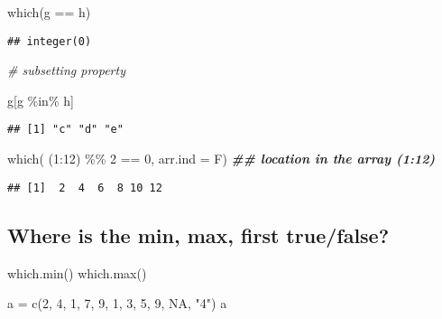 \documentclass[
]{book}
\newenvironment{Shaded}{\begin{snugshade}}{\end{snugshade}}
\newcommand{\AttributeTok}[1]{\textcolor[rgb]{0.77,0.63,0.00}{#1}}
\newcommand{\CommentTok}[1]{\textcolor[rgb]{0.56,0.35,0.01}{\textit{#1}}}
\newcommand{\ConstantTok}[1]{\textcolor[rgb]{0.00,0.00,0.00}{#1}}
\newcommand{\DecValTok}[1]{\textcolor[rgb]{0.00,0.00,0.81}{#1}}
\newcommand{\DocumentationTok}[1]{\textcolor[rgb]{0.56,0.35,0.01}{\textbf{\textit{#1}}}}
\newcommand{\FunctionTok}[1]{\textcolor[rgb]{0.00,0.00,0.00}{#1}}
\newcommand{\NormalTok}[1]{#1}
\newcommand{\OtherTok}[1]{\textcolor[rgb]{0.56,0.35,0.01}{#1}}
\newcommand{\SpecialCharTok}[1]{\textcolor[rgb]{0.00,0.00,0.00}{#1}}
\newcommand{\StringTok}[1]{\textcolor[rgb]{0.31,0.60,0.02}{#1}}
\begin{document}
\begin{Shaded}
\begin{Highlighting}[]
\FunctionTok{which}\NormalTok{(g }\SpecialCharTok{==}\NormalTok{ h)}
\end{Highlighting}
\end{Shaded}

\begin{verbatim}
## integer(0)
\end{verbatim}

\begin{Shaded}
\begin{Highlighting}[]
\CommentTok{\# subsetting property}

\NormalTok{g[g }\SpecialCharTok{\%in\%}\NormalTok{ h]}
\end{Highlighting}
\end{Shaded}

\begin{verbatim}
## [1] "c" "d" "e"
\end{verbatim}

\begin{Shaded}
\begin{Highlighting}[]
\FunctionTok{which}\NormalTok{( (}\DecValTok{1}\SpecialCharTok{:}\DecValTok{12}\NormalTok{) }\SpecialCharTok{\%\%} \DecValTok{2} \SpecialCharTok{==} \DecValTok{0}\NormalTok{, }\AttributeTok{arr.ind =}\NormalTok{ F)   }\DocumentationTok{\#\# location in the array (1:12)}
\end{Highlighting}
\end{Shaded}

\begin{verbatim}
## [1]  2  4  6  8 10 12
\end{verbatim}

\hypertarget{where-is-the-min-max-first-truefalse}{%
\subsection{Where is the min, max, first true/false?}\label{where-is-the-min-max-first-truefalse}}

which.min()
which.max()

\begin{Shaded}
\begin{Highlighting}[]
\NormalTok{a }\OtherTok{=} \FunctionTok{c}\NormalTok{(}\DecValTok{2}\NormalTok{, }\DecValTok{4}\NormalTok{, }\DecValTok{1}\NormalTok{, }\DecValTok{7}\NormalTok{, }\DecValTok{9}\NormalTok{, }\DecValTok{1}\NormalTok{, }\DecValTok{3}\NormalTok{, }\DecValTok{5}\NormalTok{, }\DecValTok{9}\NormalTok{, }\ConstantTok{NA}\NormalTok{, }\StringTok{"4"}\NormalTok{)}
\NormalTok{a}
\end{Highlighting}
\end{Shaded}
\end{document}
